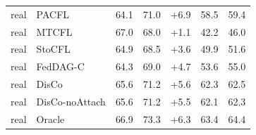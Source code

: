 {{\begin{tabular}{l l c c c c c}
real & PACFL & 64.1 & 71.0 & +6.9 & 58.5 & 59.4 \\
real & MTCFL & 67.0 & 68.0 & +1.1 & 42.2 & 46.0 \\
real & StoCFL & 64.9 & 68.5 & +3.6 & 49.9 & 51.6 \\
real & FedDAG-C & 64.3 & 69.0 & +4.7 & 53.6 & 55.0 \\
real & DisCo & 65.6 & 71.2 & +5.6 & 62.3 & 62.5 \\
real & DisCo-noAttach & 65.6 & 71.2 & +5.5 & 62.1 & 62.3 \\
real & Oracle & 66.9 & 73.3 & +6.3 & 63.4 & 64.4 \\
\bottomrule
\end{tabular}}
}
